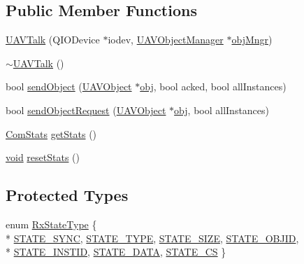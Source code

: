 \subsection*{Public Member Functions}
\begin{DoxyCompactItemize}
\item 
\hyperlink{group___u_a_v_talk_plugin_ga53c36c64288a62b44a285dfb40cee946}{U\-A\-V\-Talk} (Q\-I\-O\-Device $\ast$iodev, \hyperlink{class_u_a_v_object_manager}{U\-A\-V\-Object\-Manager} $\ast$\hyperlink{group___u_a_v_talk_plugin_ga096422f1ff46ea45de07a92c41827aa5}{obj\-Mngr})
\item 
\hyperlink{group___u_a_v_talk_plugin_ga1c6de05403ed728008c21592d142375e}{$\sim$\-U\-A\-V\-Talk} ()
\item 
bool \hyperlink{group___u_a_v_talk_plugin_gafb99b5df957808785013366dfd5bc636}{send\-Object} (\hyperlink{class_u_a_v_object}{U\-A\-V\-Object} $\ast$\hyperlink{glext_8h_a0c0d4701a6c89f4f7f0640715d27ab26}{obj}, bool acked, bool all\-Instances)
\item 
bool \hyperlink{group___u_a_v_talk_plugin_ga884c8680ea2c95bef75fca2c4c95867d}{send\-Object\-Request} (\hyperlink{class_u_a_v_object}{U\-A\-V\-Object} $\ast$\hyperlink{glext_8h_a0c0d4701a6c89f4f7f0640715d27ab26}{obj}, bool all\-Instances)
\item 
\hyperlink{struct_u_a_v_talk_1_1_com_stats}{Com\-Stats} \hyperlink{group___u_a_v_talk_plugin_gac9f7d49b556190b1b7d4b845b8b23a34}{get\-Stats} ()
\item 
\hyperlink{group___u_a_v_objects_plugin_ga444cf2ff3f0ecbe028adce838d373f5c}{void} \hyperlink{group___u_a_v_talk_plugin_gaba16247e0963a29b16a6177e685f1321}{reset\-Stats} ()
\end{DoxyCompactItemize}
\subsection*{Protected Types}
\begin{DoxyCompactItemize}
\item 
enum \hyperlink{group___u_a_v_talk_plugin_ga7f7ca2a64b0ea5ec26fb64d06bf9e09b}{Rx\-State\-Type} \{ \\*
\hyperlink{group___u_a_v_talk_plugin_gga7f7ca2a64b0ea5ec26fb64d06bf9e09baf774a734f7889e634d5b363fa3f3c793}{S\-T\-A\-T\-E\-\_\-\-S\-Y\-N\-C}, 
\hyperlink{group___u_a_v_talk_plugin_gga7f7ca2a64b0ea5ec26fb64d06bf9e09baa1450012a1828440751fcb6f17ac250f}{S\-T\-A\-T\-E\-\_\-\-T\-Y\-P\-E}, 
\hyperlink{group___u_a_v_talk_plugin_gga7f7ca2a64b0ea5ec26fb64d06bf9e09ba3257c8699631219b720e0661955ef1f6}{S\-T\-A\-T\-E\-\_\-\-S\-I\-Z\-E}, 
\hyperlink{group___u_a_v_talk_plugin_gga7f7ca2a64b0ea5ec26fb64d06bf9e09ba14ae245b4bee65b20ff1be4e31396df4}{S\-T\-A\-T\-E\-\_\-\-O\-B\-J\-I\-D}, 
\\*
\hyperlink{group___u_a_v_talk_plugin_gga7f7ca2a64b0ea5ec26fb64d06bf9e09baadc60771fcd506f0b9714cdb478ecb08}{S\-T\-A\-T\-E\-\_\-\-I\-N\-S\-T\-I\-D}, 
\hyperlink{group___u_a_v_talk_plugin_gga7f7ca2a64b0ea5ec26fb64d06bf9e09ba38e65dcea6f1e7c9e74726f3e2f0654b}{S\-T\-A\-T\-E\-\_\-\-D\-A\-T\-A}, 
\hyperlink{group___u_a_v_talk_plugin_gga7f7ca2a64b0ea5ec26fb64d06bf9e09baed576d42fef7f3e2488c61b3f64402d7}{S\-T\-A\-T\-E\-\_\-\-C\-S}
 \}
\end{DoxyCompactItemize}
